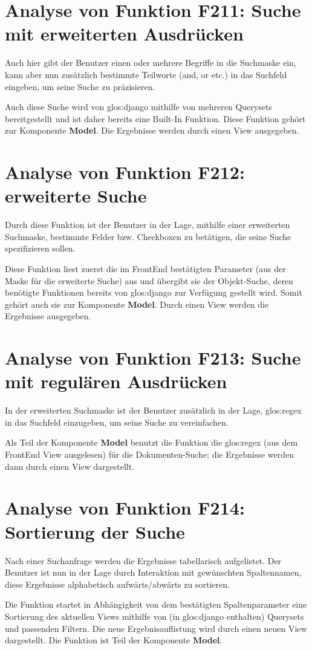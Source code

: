 \section{Analyse von Funktion F211: Suche mit erweiterten Ausdrücken}
Auch hier gibt der Benutzer einen oder mehrere Begriffe in die Suchmaske ein, kann aber nun zusätzlich bestimmte Teilworte (and, or etc.) in das Suchfeld eingeben, um seine Suche zu präzisieren.  


Auch diese Suche wird von \gls{glos:django} mithilfe von mehreren Querysets bereitgestellt und ist daher bereits eine Built-In Funktion. Diese Funktion gehört zur Komponente \textbf{Model}. Die Ergebnisse werden durch einen View ausgegeben.

\section{Analyse von Funktion F212: erweiterte Suche}
Durch diese Funktion ist der Benutzer in der Lage, mithilfe einer erweiterten Suchmaske, bestimmte Felder bzw. Checkboxen zu betätigen, die seine Suche spezifizieren sollen.


Diese Funktion liest zuerst die im FrontEnd bestätigten Parameter (aus der Maske für die erweiterte Suche) aus und übergibt sie der Objekt-Suche, deren benötigte Funktionen bereits von \gls{glos:django} zur Verfügung gestellt wird. Somit gehört auch sie zur Komponente \textbf{Model}. Durch einen View werden die Ergebnisse ausgegeben. 

\section{Analyse von Funktion F213: Suche mit regulären Ausdrücken}
In der erweiterten Suchmaske ist der Benutzer zusätzlich in der Lage, \gls{glos:regex} in das Suchfeld einzugeben, um seine Suche zu vereinfachen. 


Als Teil der Komponente \textbf{Model} benutzt die Funktion die \gls{glos:regex} (aus dem FrontEnd View ausgelesen) für die Dokumenten-Suche; die Ergebnisse werden dann durch einen View dargestellt.
 
\section{Analyse von Funktion F214: Sortierung der Suche}
Nach einer Suchanfrage werden die Ergebnisse tabellarisch aufgelistet. Der Benutzer ist nun in der Lage durch Interaktion mit gewünschten Spaltennamen, diese Ergebnisse alphabetisch aufwärts/abwärts zu sortieren. 


Die Funktion startet in Abhängigkeit von dem bestätigten Spaltenparameter eine Sortierung des aktuellen Views mithilfe von (in \gls{glos:django} enthalten) Querysets und passenden Filtern. Die neue Ergebnisauflistung wird durch einen neuen View dargestellt. Die Funktion ist Teil der Komponente \textbf{Model}. 




 
